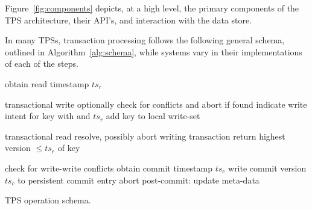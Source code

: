 {Figure~\ref{fig:components} depicts, at a high level, the primary components of the TPS architecture,  
their API's, and interaction with the data store. 

In many TPSs, transaction processing follows the following general schema, 
outlined in Algorithm~\ref{alg:schema}, while systems vary in their implementations of each of the steps.


\begin{algorithm}[tb]
\begin{algorithmic}[1]
{}
\State obtain read timestamp $ts_r$ 
\EndProcedure

 \hspace{-0.2cm} \Comment transactional write
\State optionally check for conflicts and abort if found 
\State indicate write intent for key with  and $ts_r$
\State add key to local write-set
\EndProcedure

 \Comment transactional read
	\State resolve, possibly abort writing transaction \label{l:resolve}
\EndIf
\State return highest version   $\le ts_r$ of key
\EndProcedure


\Statex \Comment check for write-write conflicts  \label{l:validate}
\State obtain commit timestamp $ts_c$
	\State write commit  version $ts_c$ to persistent commit entry \label{l:commit}
\Else
	\State abort	
\EndIf
\State post-commit: update meta-data
\EndProcedure

\end{algorithmic}
\caption{TPS operation schema.} 
\label{alg:schema}
\end{algorithm} 

}
